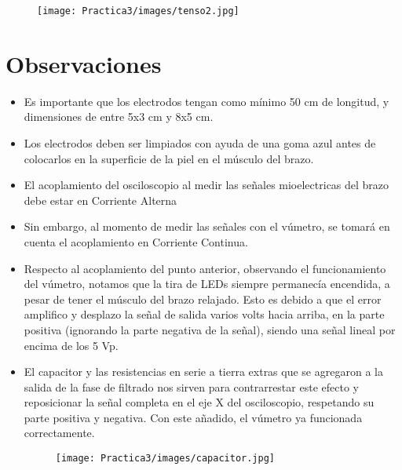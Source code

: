 \documentclass[12pt]{article}
\begin{document}
    \begin{figure}[h!]
                \centering
                \texttt{[image: Practica3/images/tenso2.jpg]}
    \end{figure} 
	

	
	\newpage
	\section{Observaciones}
	
	\begin{itemize}
            \item[\checkmark] Es importante que los electrodos tengan como mínimo 50 cm de longitud, y dimensiones de entre 5x3 cm y 8x5 cm.
            \item[\checkmark] Los electrodos deben ser limpiados con ayuda de una goma azul antes de colocarlos en la superficie de la piel en el músculo del brazo.
            \item[\checkmark] El acoplamiento del osciloscopio al medir las señales mioelectricas del brazo debe estar en Corriente Alterna
            \item[\checkmark] Sin embargo, al momento de medir las señales con el vúmetro, se tomará en cuenta el acoplamiento en Corriente Continua.
            \item[\checkmark] Respecto al acoplamiento del punto anterior, observando el funcionamiento del vúmetro, notamos que la tira de LEDs siempre permanecía encendida, a pesar de tener el músculo del brazo relajado. Esto es debido a que el error amplifico y desplazo la señal de salida varios volts hacia arriba, en la parte positiva (ignorando la parte negativa de la señal), siendo una señal lineal por encima de los 5 Vp.
            \item[\checkmark] El capacitor y las resistencias en serie a tierra extras que se agregaron a la salida de la fase de filtrado nos sirven para contrarrestar este efecto y reposicionar la señal completa en el eje X del osciloscopio, respetando su parte positiva y negativa. Con este añadido, el vúmetro ya funcionada correctamente.
            
            \begin{figure}[h!]
                \centering
                \texttt{[image: Practica3/images/capacitor.jpg]}
            \end{figure} 
            

\end{itemize}
\end{document}
